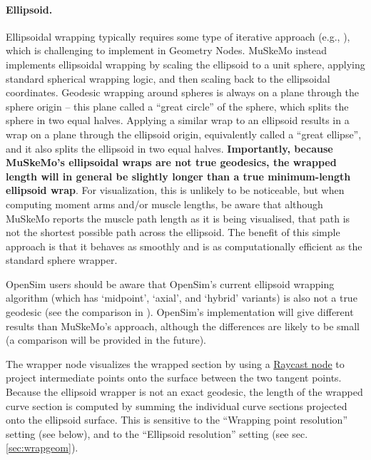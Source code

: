 \documentclass{article}
\begin{document}
\paragraph{Ellipsoid.}
\label{sec:ellipsoidwrapping}
Ellipsoidal wrapping typically requires some type of iterative approach (e.g., \cite{scholzFastMultiobstacleMuscle2016}), which is challenging to implement in Geometry Nodes. MuSkeMo instead implements ellipsoidal wrapping by scaling the ellipsoid to a unit sphere, applying standard spherical wrapping logic, and then scaling back to the ellipsoidal coordinates. Geodesic wrapping around spheres is always on a plane through the sphere origin -- this plane called a ``great circle'' of the sphere, which splits the sphere in two equal halves. Applying a similar wrap to an ellipsoid results in a wrap on a plane through the ellipsoid origin, equivalently called a ``great ellipse'', and it also splits the ellipsoid in two equal halves. \textbf{Importantly, because MuSkeMo's ellipsoidal wraps are not true geodesics, the wrapped length will in general be slightly longer than a true minimum-length ellipsoid wrap}. For visualization, this is unlikely to be noticeable, but when computing moment arms and/or muscle lengths, be aware that although MuSkeMo reports the muscle path length as it is being visualised, that path is not the shortest possible path across the ellipsoid. The benefit of this simple approach is that it behaves as smoothly and is as computationally efficient as the standard sphere wrapper.

OpenSim users should be aware that OpenSim's current ellipsoid wrapping algorithm (which has `midpoint', `axial', and `hybrid' variants) is also not a true geodesic (see the comparison in \cite{marsdenNovelApproachPrediction2008}). OpenSim's implementation will give different results than MuSkeMo's approach, although the differences are likely to be small (a comparison will be provided in the future).


The wrapper node visualizes the wrapped section by using a \href{https://docs.blender.org/manual/en/latest/modeling/geometry_nodes/geometry/sample/raycast.html}{Raycast node} to project intermediate points onto the surface between the two tangent points. Because the ellipsoid wrapper is not an exact geodesic, the length of the wrapped curve section is computed by summing the individual curve sections projected onto the ellipsoid surface. This is sensitive to the ``Wrapping point resolution'' setting (see below), and to the ``Ellipsoid resolution'' setting (see sec. \ref{sec:wrapgeom}).
\end{document}
